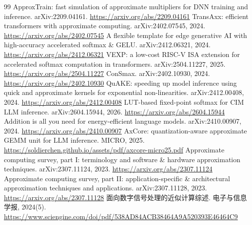 \documentclass[11pt,a4paper]{ctexart}
\begin{document}
\begin{thebibliography}{99}
 ApproxTrain: fast simulation of approximate multipliers for DNN training and inference. arXiv:2209.04161. \url{https://arxiv.org/abs/2209.04161}
 TransAxx: efficient transformers with approximate computing. arXiv:2402.07545, 2024. \url{https://arxiv.org/abs/2402.07545}
 A flexible template for edge generative AI with high-accuracy accelerated softmax \& GELU. arXiv:2412.06321, 2024. \url{https://arxiv.org/abs/2412.06321}
 VEXP: a low-cost RISC-V ISA extension for accelerated softmax computation in transformers. arXiv:2504.11227, 2025. \url{https://arxiv.org/abs/2504.11227}
 ConSmax. arXiv:2402.10930, 2024. \url{https://arxiv.org/abs/2402.10930}
 QuAKE: speeding up model inference using quick and approximate kernels for exponential non-linearities. arXiv:2412.00408, 2024. \url{https://arxiv.org/abs/2412.00408}
 LUT-based fixed-point softmax for CIM LLM inference. arXiv:2604.15944, 2026. \url{https://arxiv.org/abs/2604.15944}
 Addition is all you need for energy-efficient language models. arXiv:2410.00907, 2024. \url{https://arxiv.org/abs/2410.00907}
 AxCore: quantization-aware approximate GEMM unit for LLM inference. MICRO, 2025. \url{https://soldierchen.github.io/assets/pdf/axcore-micro25.pdf}
 Approximate computing survey, part I: terminology and software \& hardware approximation techniques. arXiv:2307.11124, 2023. \url{https://arxiv.org/abs/2307.11124}
 Approximate computing survey, part II: application-specific \& architectural approximation techniques and applications. arXiv:2307.11128, 2023. \url{https://arxiv.org/abs/2307.11128}
 面向数字信号处理的近似计算综述. 电子与信息学报, 2024(5). \url{https://www.sciengine.com/doi/pdf/538AD84ACB38464A9A520393E46464C9}
\end{thebibliography}
\end{document}
